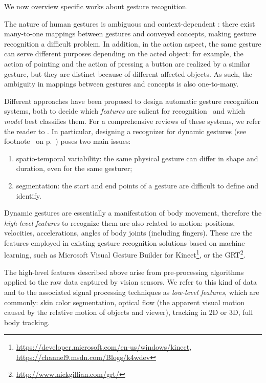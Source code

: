 We now overview specific works about gesture recognition.

The nature of human gestures is ambiguous and context-dependent \cite{mcneill:1996,messing:1999,kita:2017:gesture-concept-hp}: there exist many-to-one mappings between gestures and conveyed concepts, making gesture recognition a difficult problem.
In addition, in the action aspect, the same gesture can serve different purposes depending on the acted object: for example, the action of pointing and the action of pressing a button are realized by a similar gesture, but they are distinct because of different affected objects.
As such, the ambiguity in mappings between gestures and concepts is also one-to-many.

Different approaches have been proposed to design automatic gesture recognition systems, both to decide which \emph{features} are salient for recognition~\cite{campbell:1996:features} and which \emph{model} best classifies them.
For a comprehensive reviews of these systems, we refer the reader to \cite{wu:1999:review,mitra:2007:review,keskin:2011:hand}.
In particular, designing a recognizer for dynamic gestures (see footnote~ on p.~\pageref{footnote:static_dynamic_gestures}) poses two main issues:
\begin{enumerate}
\item spatio-temporal variability: the same physical gesture can differ in shape and duration, even for the same gesturer;

\item segmentation: the start and end points of a gesture are difficult to define and identify.
\end{enumerate}

Dynamic gestures are essentially a manifestation of body movement, therefore the \emph{high-level features} to recognize them are also related to motion: positions, velocities, accelerations, angles of body joints (including fingers).
These are the features employed in existing gesture recognition solutions based on machine learning, such as Microsoft Visual Gesture Builder for Kinect\footnote{\url{https://developer.microsoft.com/en-us/windows/kinect}, \\ \url{https://channel9.msdn.com/Blogs/k4wdev}}, or the \ac{GRT}\footnote{\url{http://www.nickgillian.com/grt/}}.

The high-level features described above arise from pre-processing algorithms applied to the raw data captured by vision sensors. We refer to this kind of data and to the associated signal processing techniques as \emph{low-level features}, which are commonly: skin color segmentation, optical flow (the apparent visual motion caused by the relative motion of objects and viewer), \armhand{} tracking in 2D or 3D, full body tracking.

